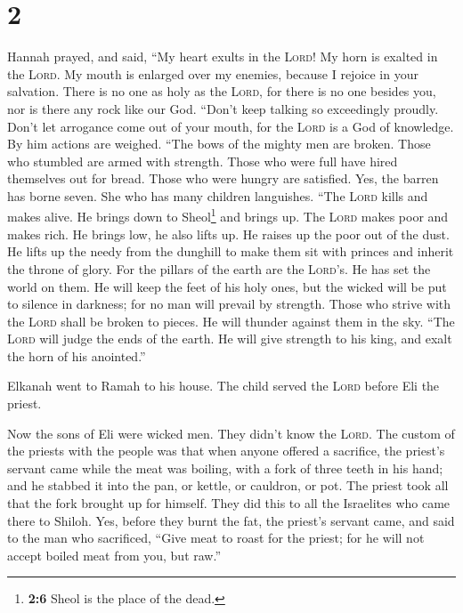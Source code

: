 \hypertarget{section-1}{%
\section{2}\label{section-1}}

 Hannah prayed, and said, ``My heart exults in the
\textsc{Lord}! My horn is exalted in the \textsc{Lord}. My mouth is
enlarged over my enemies, because I rejoice in your salvation.
 There is no one as holy as the \textsc{Lord}, for there
is no one besides you, nor is there any rock like our God.
 ``Don't keep talking so exceedingly proudly. Don't let
arrogance come out of your mouth, for the \textsc{Lord} is a God of
knowledge. By him actions are weighed.  ``The bows of the
mighty men are broken. Those who stumbled are armed with strength.
 Those who were full have hired themselves out for bread.
Those who were hungry are satisfied. Yes, the barren has borne seven.
She who has many children languishes.  ``The \textsc{Lord}
kills and makes alive. He brings down to Sheol\footnote{\textbf{2:6}
  Sheol is the place of the dead.} and brings up.  The
\textsc{Lord} makes poor and makes rich. He brings low, he also lifts
up.  He raises up the poor out of the dust. He lifts up
the needy from the dunghill to make them sit with princes and inherit
the throne of glory. For the pillars of the earth are the
\textsc{Lord}'s. He has set the world on them.  He will
keep the feet of his holy ones, but the wicked will be put to silence in
darkness; for no man will prevail by strength.  Those who
strive with the \textsc{Lord} shall be broken to pieces. He will thunder
against them in the sky. ``The \textsc{Lord} will judge the ends of the
earth. He will give strength to his king, and exalt the horn of his
anointed.''

 Elkanah went to Ramah to his house. The child served the
\textsc{Lord} before Eli the priest.

 Now the sons of Eli were wicked men. They didn't know
the \textsc{Lord}.  The custom of the priests with the
people was that when anyone offered a sacrifice, the priest's servant
came while the meat was boiling, with a fork of three teeth in his hand;
 and he stabbed it into the pan, or kettle, or cauldron,
or pot. The priest took all that the fork brought up for himself. They
did this to all the Israelites who came there to Shiloh. 
Yes, before they burnt the fat, the priest's servant came, and said to
the man who sacrificed, ``Give meat to roast for the priest; for he will
not accept boiled meat from you, but raw.''

